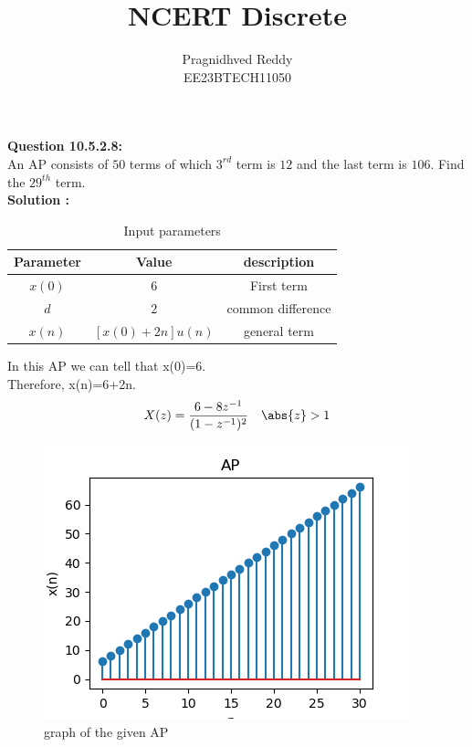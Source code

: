 \documentclass[journal,12pt,twocolumn]{IEEEtran}
\title{NCERT Discrete}
\author{Pragnidhved Reddy\\EE23BTECH11050}
\date{}
\begin{document}
\maketitle
\newpage
\bigskip
\textbf{Question 10.5.2.8:}\\
An AP consists of $50$ terms of which $3^{rd}$ term is $12$ and the last term is $106$. Find the $29^{th}$ term.\\
\textbf{Solution :}\\
\begin{table}[H]
\centering
\begin{tabular}{|c|c|c|}\hline
\textbf{Parameter} & \textbf{Value} & \textbf{description}\\ \hline
$x(0)$ & $6$ & First term\\ \hline
$d$ & $2$ & common difference\\ \hline
$x(n)$ & $[x(0)+2n]u(n)$ & general term \\ \hline
\end{tabular}
\caption{Input parameters}
\end{table}
In this AP we can tell that x(0)=6.\\
Therefore, x(n)=6+2n.
$$X(z)=\frac{6-8z^{-1}}{(1-z^{-1})^2} \quad \abs{z}>1$$
\begin{figure}[h!]
    \centering
    \includegraphics{figs/plot.png}
    \caption{graph of the given AP}
    \label{fig:1}
\end{figure}
\end{document}
